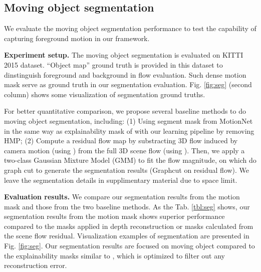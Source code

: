 \documentclass[runningheads]{llncs}
\begin{document}
\subsection{Moving object segmentation}
\vspace{-0.5\baselineskip}
\label{seg_exp}
We evaluate the moving object segmentation performance to test the capability of capturing foreground motion in our framework.

\vspace{0.5\baselineskip}
\noindent\textbf{Experiment setup.} The moving object segmentation is evaluated on KITTI 2015 dataset. ``Object map'' ground truth is provided in this dataset to dinstinguish foreground and background in flow evaluation. Such dense motion mask serve as ground truth in our segmentation evaluation. Fig. \ref{fig:seg} (second column) shows some visualization of segmentation ground truths. 

For better quantitative comparison, we propose several baseline methods to do moving object segmentation, including: (1) Using segment mask from MotionNet in the same way as explainability mask of \cite{zhou2017unsupervised} with our learning pipeline by removing HMP; 
(2) Compute a residual flow map by substracting 3D flow induced by camera motion (using ) from the full 3D scene flow (using ). Then, we apply a two-class Gaussian Mixture Model (GMM) to fit the flow magnitude, on which do graph cut to generate the segmentation results (Graphcut on residual flow). We leave the segmentation details in supplimentary material due to space limit.

\vspace{0.5\baselineskip}
\noindent\textbf{Evaluation results.}
We compare our segmentation results from the motion mask and those from the two baseline methods. As the Tab. \ref{tbl:seg} shows, our segmentation results from the motion mask shows superior performance compared to the masks applied in depth reconstruction or masks calculated from the scene flow residual. Visualization examples of segmentation are presented in Fig. \ref{fig:seg}. Our segmentation results are focused on moving object compared to the explainability masks similar to \cite{zhou2017unsupervised}, which is optimized to filter out any reconstruction error.
\end{document}
